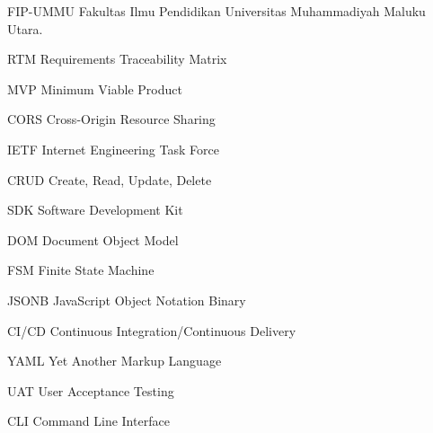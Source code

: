 \begin{leftitemize}
    \item[FIP-UMMU] Fakultas Ilmu Pendidikan Universitas Muhammadiyah Maluku Utara.
    \item[RTM] Requirements Traceability Matrix
    \item[MVP] Minimum Viable Product
    \item[CORS] Cross-Origin Resource Sharing
    \item[IETF] Internet Engineering Task Force
    \item[CRUD] Create, Read, Update, Delete
    \item[SDK] Software Development Kit
    \item[DOM] Document Object Model
    \item[FSM] Finite State Machine
    \item[JSONB] JavaScript Object Notation Binary
    \item[CI/CD] Continuous Integration/Continuous Delivery
    \item[YAML] Yet Another Markup Language
    \item[UAT] User Acceptance Testing
    \item[CLI] Command Line Interface

\end{leftitemize}

\clearpage